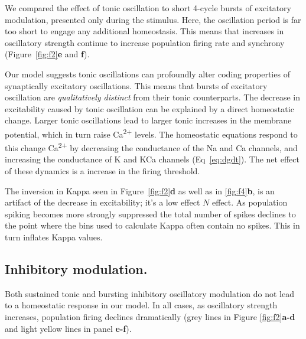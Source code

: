 \documentclass{article}
\begin{document}
We compared the effect of tonic oscillation to short 4-cycle bursts of excitatory modulation, presented only during the stimulus. Here, the oscillation period is far too short to engage any additional homeostasis. This means that increases in oscillatory strength continue to increase population firing rate and synchrony (Figure~\ref{fig:f2}\textbf{e} and \textbf{f}).

Our model suggests tonic oscillations can profoundly alter coding properties of synaptically excitatory oscillations. This means that bursts of excitatory oscillation are \textit{qualitatively distinct} from their tonic counterparts. The decrease in excitability caused by tonic oscillation can be explained by a direct homeostatic change. Larger tonic oscillations lead to larger tonic increases in the membrane potential, which in turn raise Ca\textsuperscript{2+} levels. The homeostatic equations respond to this change Ca\textsuperscript{2+} by decreasing the conductance of the Na and Ca channels, and increasing the conductance of K and KCa channels (Eq~\ref{eq:dgdt}). The net effect of these dynamics is a increase in the firing threshold.

The inversion in Kappa seen in Figure~\ref{fig:f2}\textbf{d} as well as in \ref{fig:f4}\textbf{b}, is an artifact of the decrease in excitability; it's a low effect $N$ effect. As population spiking becomes more strongly suppressed the total number of spikes declines to the point where the bins used to calculate Kappa often contain no spikes. This in turn inflates Kappa values.

\subsection*{Inhibitory modulation.}
Both sustained tonic and bursting inhibitory oscillatory modulation do not lead to a homeostatic response in our model. In all cases, as oscillatory strength increases, population firing declines dramatically (grey lines in Figure \ref{fig:f2}\textbf{a-d} and light yellow lines in panel \textbf{e-f}).

\end{document}
